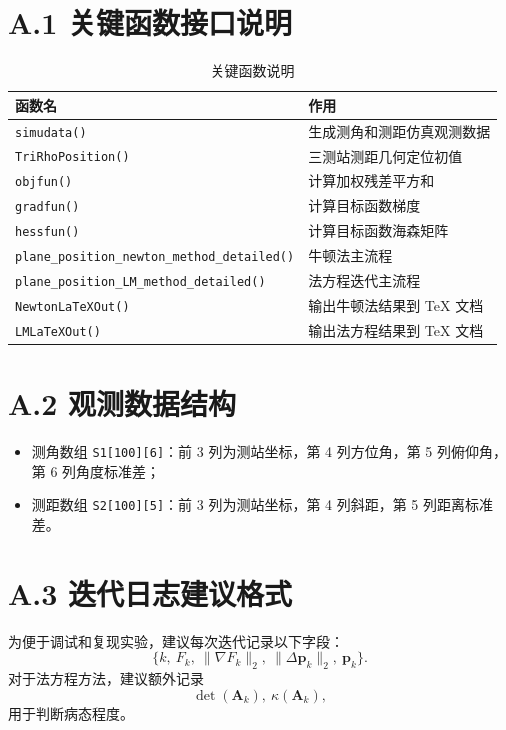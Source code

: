 \section*{A.1 关键函数接口说明}
\begin{table}[H]
\centering
\caption{关键函数说明}
\begin{tabular}{ll}
\toprule
函数名 & 作用 \\
\midrule
\texttt{simudata()} & 生成测角和测距仿真观测数据 \\
\texttt{TriRhoPosition()} & 三测站测距几何定位初值 \\
\texttt{objfun()} & 计算加权残差平方和 \\
\texttt{gradfun()} & 计算目标函数梯度 \\
\texttt{hessfun()} & 计算目标函数海森矩阵 \\
\texttt{plane\_position\_newton\_method\_detailed()} & 牛顿法主流程 \\
\texttt{plane\_position\_LM\_method\_detailed()} & 法方程迭代主流程 \\
\texttt{NewtonLaTeXOut()} & 输出牛顿法结果到 TeX 文档 \\
\texttt{LMLaTeXOut()} & 输出法方程结果到 TeX 文档 \\
\bottomrule
\end{tabular}
\end{table}

\section*{A.2 观测数据结构}
\begin{itemize}
  \item 测角数组 \texttt{S1[100][6]}：前 3 列为测站坐标，第 4 列方位角，第 5 列俯仰角，第 6 列角度标准差；
  \item 测距数组 \texttt{S2[100][5]}：前 3 列为测站坐标，第 4 列斜距，第 5 列距离标准差。
\end{itemize}

\section*{A.3 迭代日志建议格式}
为便于调试和复现实验，建议每次迭代记录以下字段：
\[
\{k,\ F_k,\ \|\nabla F_k\|_2,\ \|\Delta\bm p_k\|_2,\ \bm p_k\}.
\]
对于法方程方法，建议额外记录
\[
\det(\bm A_k),\ \kappa(\bm A_k),
\]
用于判断病态程度。

